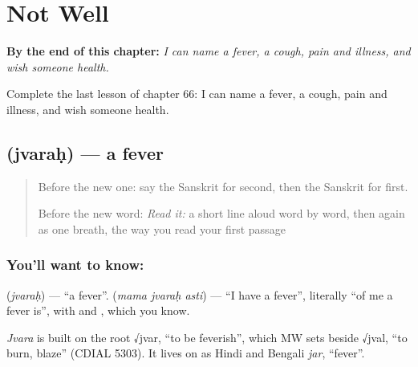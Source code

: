 
\chapter{Not Well}
\label{ch:sa-not-well}

\begin{chapteropening}
\textbf{By the end of this chapter:} \emph{I can name a fever, a cough, pain and illness, and wish someone health.}

Complete the last lesson of chapter 66: I can name a fever, a cough, pain and illness, and wish someone health.
\end{chapteropening}

\section[\texorpdfstring{\sk{ज्वरः} (jvaraḥ)}{ज्वरः (jvaraḥ)}]{ (jvaraḥ) — a fever}

\label{lesson:SA-C66-fever}



\begin{quote}
Before the new one: say the Sanskrit for second, then the Sanskrit for first.

Before the new word: \emph{Read it:} a short line aloud word by word, then again as one breath, the way you read your first passage
\end{quote}

\subsection*{You'll want to know: }
\textbf{} (\emph{jvaraḥ}) — \textquotedblleft{}a fever\textquotedblright{}. \textbf{  } (\emph{mama jvaraḥ asti}) — \textquotedblleft{}I have a fever\textquotedblright{}, literally \textquotedblleft{}of me a fever is\textquotedblright{}, with \textbf{} and \textbf{}, which you know.

\begin{cousinweb}
\emph{Jvara} is built on the root √jvar, \textquotedblleft{}to be feverish\textquotedblright{}, which MW sets beside √jval, \textquotedblleft{}to burn, blaze\textquotedblright{} (CDIAL 5303). It lives on as Hindi and Bengali \emph{jar}, \textquotedblleft{}fever\textquotedblright{}.
\end{cousinweb}

